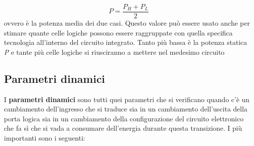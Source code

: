 \documentclass[12pt, a4paper]{report}
\begin{document}
\begin{itemize}
    \begin{equation}
        P = \frac{P_{H} + P_{L}}{2}
    \end{equation}
    ovvero è la potenza media dei due casi. Questo valore può essere usato anche per stimare quante celle logiche possono essere raggruppate con quella specifica tecnologia all'interno del circuito integrato. Tanto più bassa è la potenza statica \textit{P} e tante più celle logiche si riusciranno a mettere nel medesimo circuito
\end{itemize}

\subsection{Parametri dinamici}
I \textbf{parametri dinamici} sono tutti quei parametri che si verificano quando c'è un cambiamento dell'ingresso che si traduce sia in un cambiamento dell'uscita della porta logica sia in un cambiamento della configurazione del circuito elettronico che fa sì che si vada a consumare dell'energia durante questa transizione. I più importanti sono i seguenti:
\end{document}
